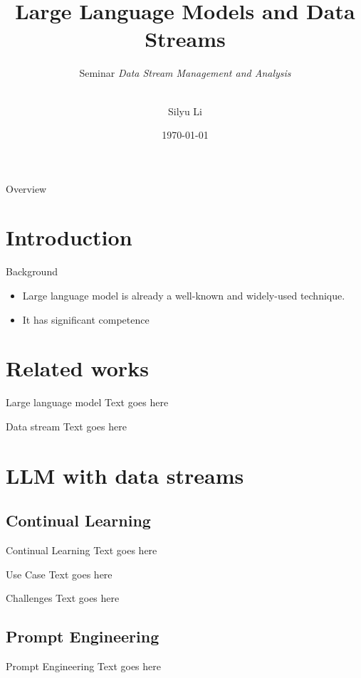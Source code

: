 \documentclass[t]{beamer}
\title{Large Language Models and Data Streams}
\subtitle{
  Seminar \textsl{Data Stream Management and Analysis}\\[1ex]
  \insertdate\\[1ex]
  \insertauthor
}
\date{\today}
\author{Silyu Li}
\institute{RWTH Aachen University}
\begin{document}
\begin{frame}[plain]
  \titlepage
\end{frame}

\begin{frame}{Overview}
  \tableofcontents
\end{frame}

\section{Introduction}
\begin{frame}{Background}
  \begin{itemize}
    \item Large language model is already a well-known and widely-used technique.
    \item It has significant competence
  \end{itemize}
\end{frame}

\section{Related works}
\begin{frame}{Large language model}
  Text goes here
\end{frame}

\begin{frame}{Data stream}
  Text goes here
\end{frame}

\section{LLM with data streams}
\subsection{Continual Learning}
\begin{frame}{Continual Learning}
  Text goes here
\end{frame}

\begin{frame}{Use Case}
  Text goes here
\end{frame}

\begin{frame}{Challenges}
  Text goes here
\end{frame}

\subsection{Prompt Engineering}
\begin{frame}{Prompt Engineering}
  Text goes here
\end{frame}
\end{document}
